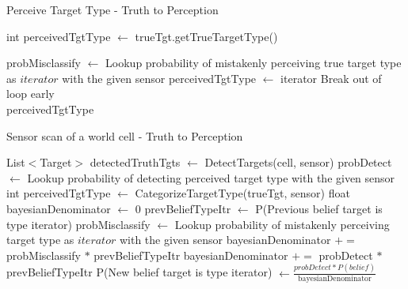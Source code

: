 \begin{algorithm}[H]
	\caption{Perceive Target Type - Truth to Perception}
	\label{alg:perceiveTgt}
	\begin{algorithmic}[1]
		\State int perceivedTgtType $\gets$ trueTgt.getTrueTargetType()
		
				\State probMisclassify $ \gets $ Lookup probability of mistakenly perceiving true target type as $iterator$ with the given sensor
					\State perceivedTgtType $\gets$ iterator
					\State Break out of loop early
				\EndIf
			\EndIf
		\EndFor\\

		\Return perceivedTgtType
		\EndFunction
	\end{algorithmic}
\end{algorithm}

\begin{algorithm}[H]
	\caption{Sensor scan of a world cell - Truth to Perception}
	\label{alg:sensorScan}
	\begin{algorithmic}[1]
		\State List$<$Target$>$ detectedTruthTgts $\gets$ DetectTargets(cell, sensor)
		\State probDetect $\gets$ Lookup probability of detecting perceived target type with the given sensor
			\State int perceivedTgtType $\gets$ CategorizeTargetType(trueTgt, sensor)
			\State float bayesianDenominator $\gets$ 0
				\State prevBeliefTypeItr $\gets$ P(Previous belief target is type iterator)
					\State probMisclassify $ \gets $ Lookup probability of mistakenly perceiving target type as $iterator$ with the given sensor
					\State bayesianDenominator $\mathrel{+}=$ probMisclassify $*$ prevBeliefTypeItr
				\Else
					\State bayesianDenominator $\mathrel{+}=$ probDetect $*$ prevBeliefTypeItr
				\EndIf
			\EndFor
			\State P(New belief target is type iterator) $\gets \frac{probDetect * P(belief)}{\text{bayesianDenominator}}$

		\EndFor
		\EndFunction
	\end{algorithmic}
\end{algorithm}
